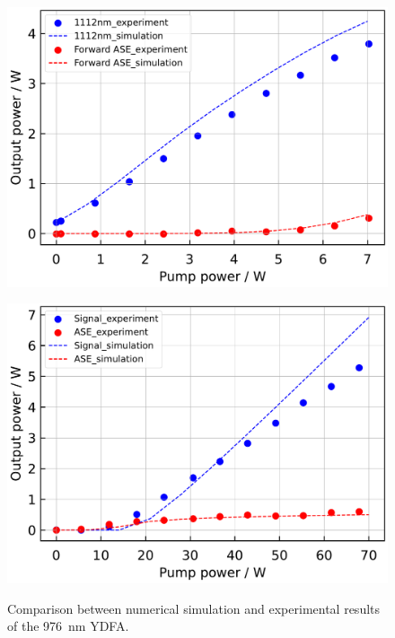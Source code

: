 \documentclass{osa-article}
\begin{document}
\begin{figure}[h!]
  \begin{minipage}[b]{0.5\linewidth}
    \centering
    \includegraphics[keepaspectratio, width=0.9\linewidth]{./Figure/1112nmYDFA2ndStageOutput_ComparisonBetweenSimAndExp.pdf}
    \subcaption{}
    \label{fig:ComparisonBetweenSimAndExpOf1112YDFA}
  \end{minipage}
  \begin{minipage}[b]{0.5\linewidth}
    \centering
    \includegraphics[keepaspectratio, width=0.9\linewidth]{./Figure/976nmYDFAOutput_ComparisonBetweenSimAndExp.pdf}
    \subcaption{}
    \label{fig:ComparisonBetweenSimAndExpOf976YDFA}
  \end{minipage}
  \caption{Comparison between numerical simulation and experimental results of the \SI{976}{\nm} YDFA.}
  \label{fig:ComparisonBetweenSimAndExpOfYDFA}
\end{figure}
\end{document}
